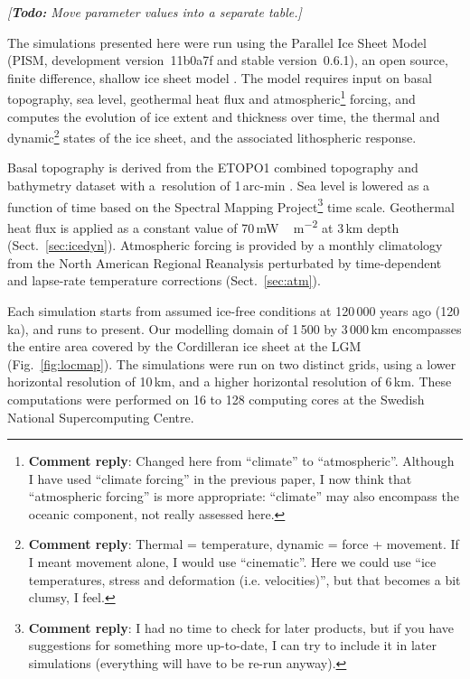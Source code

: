 \documentclass[tc, manuscript]{copernicus}
\newcommand{\renote}[1]{\footnote{\textbf{Comment reply}: #1}}
\newcommand{\todo}[1]{\emph{[\textbf{Todo:} #1]}}
\begin{document}
\todo{Move parameter values into a separate table.}

The simulations presented here were run using the Parallel Ice Sheet Model
(PISM, development version~11b0a7f and stable version~0.6.1), an open source,
finite difference, shallow ice sheet model \citep{PISM-authors.2014}. The model
requires input on basal topography, sea level, geothermal heat flux and
atmospheric\renote{
    Changed here from ``climate'' to ``atmospheric''. Although I have used
    ``climate forcing'' in the previous paper, I now think that ``atmospheric
    forcing'' is more appropriate: ``climate'' may also encompass the oceanic
    component, not really assessed here.}
forcing, and computes the evolution of ice extent
and thickness over time, the thermal and dynamic\renote{
    Thermal = temperature, dynamic = force + movement. If I meant movement
    alone, I would use ``cinematic''. Here we could use ``ice temperatures,
    stress and deformation (i.e. velocities)'', but that becomes a bit clumsy,
    I feel.}
states of the ice sheet, and the associated lithospheric response.

Basal topography is derived from the ETOPO1 combined topography and bathymetry
dataset with a~resolution of 1\,arc-min \citep{Amante.Eakins.2009}. Sea level
is lowered as a function of time based on the Spectral Mapping Project\renote{
    I had no time to check for later products, but if you have suggestions for
    something more up-to-date, I can try to include it in later simulations
    (everything will have to be re-run anyway).}
\citep[SPECMAP;][]{Imbrie.etal.1989} time scale. Geothermal heat flux
is applied as a constant value of 70\,\unit{mW\,m^{-2}} at 3\,km depth
(Sect.~\ref{sec:icedyn}). Atmospheric forcing is provided by a monthly
climatology from the North American Regional Reanalysis
\citep[NARR;][]{Mesinger.etal.2006} perturbated by time-dependent and
lapse-rate temperature corrections (Sect.~\ref{sec:atm}).

Each simulation starts from assumed ice-free conditions at 120\,000 years ago
(120\,ka), and runs to present. Our modelling domain of 1\,500 by 3\,000\,km
encompasses the entire area covered by the Cordilleran ice sheet at the LGM
(Fig.~\ref{fig:locmap}). The simulations were run on two distinct grids, using
a lower horizontal resolution of 10\,km, and a higher horizontal resolution of
6\,km. These computations were performed on 16 to 128 computing cores at the
Swedish National Supercomputing Centre.

\end{document}
